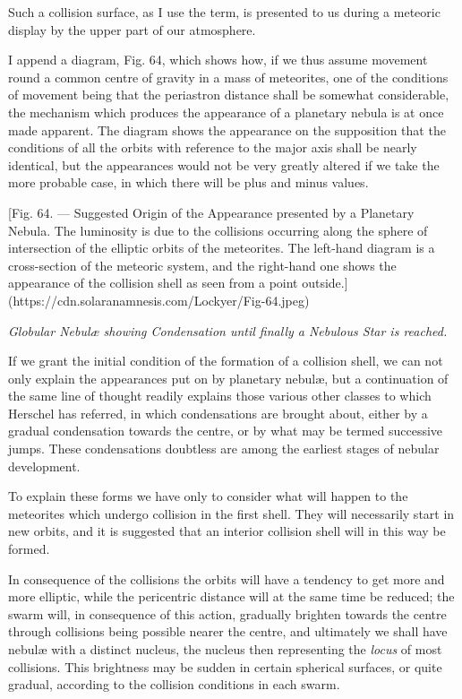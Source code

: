 \documentclass[a4paper, 12pt, oneside, polutonikogreek, english]{article}
\begin{document}
Such a collision surface, as I use the term, is presented to us during a meteoric display by the upper part of our atmosphere.

I append a diagram, Fig. 64, which shows how, if we thus assume movement round a common centre of gravity in a mass of meteorites, one of the conditions of movement being that the periastron distance shall be somewhat considerable, the mechanism which produces the appearance of a planetary nebula is at once made apparent. The diagram shows the appearance on the supposition that the conditions of all the orbits with reference to the major axis shall be nearly identical, but the appearances would not be very greatly altered if we take the more probable case, in which there will be plus and minus values.

[Fig. 64. --- Suggested Origin of the Appearance presented by a Planetary Nebula. The luminosity is due to the collisions occurring along the sphere of intersection of the elliptic orbits of the meteorites. The left-hand diagram is a cross-section of the meteoric system, and the right-hand one shows the appearance of the collision shell as seen from a point outside.](https://cdn.solaranamnesis.com/Lockyer/Fig-64.jpeg)

\emph{Globular Nebulæ showing Condensation until finally a Nebulous Star is reached.}

If we grant the initial condition of the formation of a collision shell, we can not only explain the appearances put on by planetary nebulæ, but a continuation of the same line of thought readily explains those various other classes to which Herschel has referred, in which condensations are brought about, either by a gradual condensation towards the centre, or by what may be termed successive jumps. These condensations doubtless are among the earliest stages of nebular development.

To explain these forms we have only to consider what will happen to the meteorites which undergo collision in the first shell. They will necessarily start in new orbits, and it is suggested that an interior collision shell will in this way be formed.

In consequence of the collisions the orbits will have a tendency to get more and more elliptic, while the pericentric distance will at the same time be reduced; the swarm will, in consequence of this action, gradually brighten towards the centre through collisions being possible nearer the centre, and ultimately we shall have nebulæ with a distinct nucleus, the nucleus then representing the \emph{locus} of most collisions. This brightness may be sudden in certain spherical surfaces, or quite gradual, according to the collision conditions in each swarm.
\end{document}
